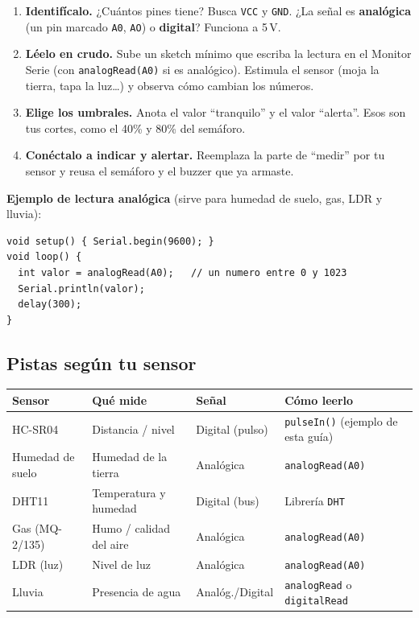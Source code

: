 \documentclass[10pt,letterpaper]{article}
\begin{document}
\begin{enumerate}
\item \textbf{Identifícalo.} ¿Cuántos pines tiene? Busca \texttt{VCC} y \texttt{GND}. ¿La señal es
\textbf{analógica} (un pin marcado \texttt{A0}, \texttt{AO}) o \textbf{digital}? Funciona a 5\,V.
\item \textbf{Léelo en crudo.} Sube un sketch mínimo que escriba la lectura en el Monitor Serie
(con \texttt{analogRead(A0)} si es analógico). Estimula el sensor (moja la tierra, tapa la luz\ldots)
y observa cómo cambian los números.
\item \textbf{Elige los umbrales.} Anota el valor ``tranquilo'' y el valor ``alerta''. Esos son tus
cortes, como el 40\% y 80\% del semáforo.
\item \textbf{Conéctalo a indicar y alertar.} Reemplaza la parte de ``medir'' por tu sensor y reusa
el semáforo y el buzzer que ya armaste.
\end{enumerate}

\textbf{Ejemplo de lectura analógica} (sirve para humedad de suelo, gas, LDR y lluvia):
\begin{lstlisting}[style=arduino]
void setup() { Serial.begin(9600); }
void loop() {
  int valor = analogRead(A0);   // un numero entre 0 y 1023
  Serial.println(valor);
  delay(300);
}
\end{lstlisting}

\subsection{Pistas según tu sensor}
\begin{tabularx}{\linewidth}{@{}L{3.2cm}L{3.4cm}L{2.4cm}Y@{}}
\hline
\textbf{Sensor} & \textbf{Qué mide} & \textbf{Señal} & \textbf{Cómo leerlo}\\
\hline
HC-SR04 & Distancia / nivel & Digital (pulso) & \texttt{pulseIn()} (ejemplo de esta guía)\\
Humedad de suelo & Humedad de la tierra & Analógica & \texttt{analogRead(A0)}\\
DHT11 & Temperatura y humedad & Digital (bus) & Librería \texttt{DHT}\\
Gas (MQ-2/135) & Humo / calidad del aire & Analógica & \texttt{analogRead(A0)}\\
LDR (luz) & Nivel de luz & Analógica & \texttt{analogRead(A0)}\\
Lluvia & Presencia de agua & Analóg./Digital & \texttt{analogRead} o \texttt{digitalRead}\\
\hline
\end{tabularx}
\end{document}
